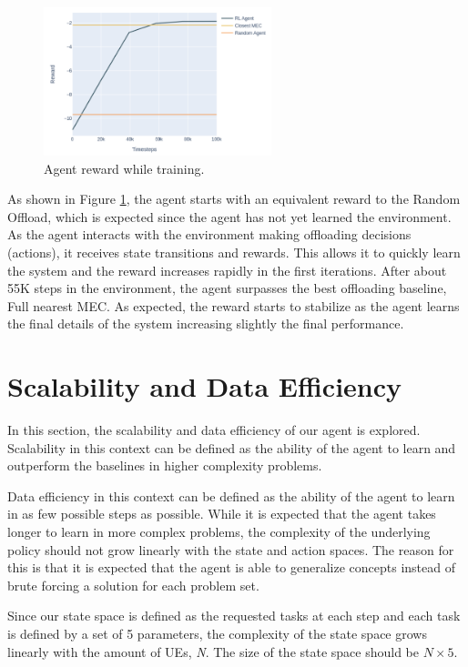\begin{figure}[H]
  \centering
  \includegraphics[width=250px]{images/5_5_training.png}
  \caption{Agent reward while training.}  \label{5_5_training}
\end{figure}

As shown in Figure \ref{5_5_training}, the agent starts with an equivalent reward to the Random Offload, which is expected since the agent has not yet learned the environment. As the agent interacts with the environment making offloading decisions (actions), it receives state transitions and rewards. This allows it to quickly learn the system and the reward increases rapidly in the first iterations. After about 55K steps in the environment, the agent surpasses the best offloading baseline, Full nearest MEC. As expected, the reward starts to stabilize as the agent learns the final details of the system increasing slightly the final performance.

\section{Scalability and Data Efficiency} \label{scalability_data}

In this section, the scalability and data efficiency of our agent is explored. Scalability in this context can be defined as the ability of the agent to learn and outperform the baselines in higher complexity problems. 

Data efficiency in this context can be defined as the ability of the agent to learn in as few possible steps as possible. While it is expected that the agent takes longer to learn in more complex problems, the complexity of the underlying policy should not grow linearly with the state and action spaces. The reason for this is that it is expected that the agent is able to generalize concepts instead of brute forcing a solution for each problem set.

Since our state space is defined as the requested tasks at each step and each task is defined by a set of 5 parameters, the complexity of the state space grows linearly with the amount of \acrshort{UE}s, \emph{N}. The size of the state space should be $N \times 5$. 

